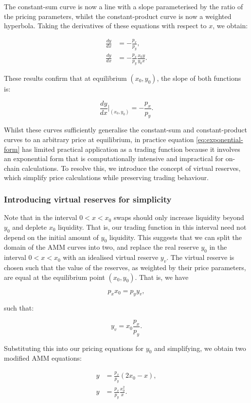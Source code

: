 \documentclass{article}
\begin{document}
The constant-sum curve is now a line with a slope parameterised by the ratio of the pricing parameters, whilst the constant-product curve is now a weighted hyperbola. Taking the derivatives of these equations with respect to $x$, we obtain:

\begin{align}
    \frac{dy}{dx} &= -\frac{p_x}{p_y}, \\
    \frac{dy}{dx} &= -\frac{p_x}{p_y} \frac{x_0 y}{y_0 x}.
\end{align}

These results confirm that at equilibrium $(x_0, y_0)$, the slope of both functions is:

\[
\frac{dy}{dx} \Big|_{(x_0, y_0)} = -\frac{p_x}{p_y}.
\]

Whilst these curves sufficiently generalise the constant-sum and constant-product curves to an arbitrary price at equilibrium, in practice equation \eqref{eq:exponential-form} has limited practical application as a trading function because it involves an exponential form that is computationally intensive and impractical for on-chain calculations. To resolve this, we introduce the concept of virtual reserves, which simplify price calculations while preserving trading behaviour.


\subsubsection{Introducing virtual reserves for simplicity}

Note that in the interval $0 < x < x_0$ swaps should only increase liquidity beyond $y_0$ and deplete $x_0$ liquidity. That is, our trading function in this interval need not depend on the initial amount of $y_0$ liquidity. This suggests that we can split the domain of the AMM curves into two, and replace the real reserve $y_0$ in the interval $0 < x < x_0$ with an idealised virtual reserve $y_v$. The virtual reserve is chosen such that the value of the reserves, as weighted by their price parameters, are equal at the equilibrium point $(x_0, y_0)$. That is, we have

\[
p_x x_0 = p_y y_v,
\]

such that:

\[
y_v = x_0 \frac{p_x}{p_y}.
\]

Substituting this into our pricing equations for $y_0$ and simplifying, we obtain two modified AMM equations:

\begin{align}
    y &= \frac{p_x}{p_y} (2x_0 - x), \\
    y &= \frac{p_x}{p_y} \frac{x_0^2}{x}.
\end{align}
\end{document}
